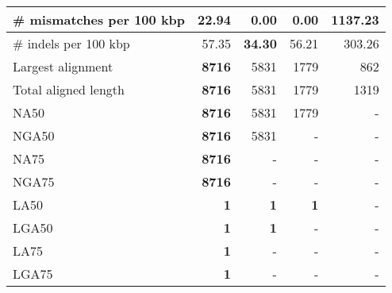 \documentclass[12pt,a4paper]{article}
\begin{document}
\begin{table}[ht]
\begin{center}
\begin{tabular}{|l*{4}{|r}|}
\# mismatches per 100 kbp & 22.94 & {\bf 0.00} & {\bf 0.00} & 1137.23 \\ \hline
\# indels per 100 kbp & 57.35 & {\bf 34.30} & 56.21 & 303.26 \\ \hline
Largest alignment & {\bf 8716} & 5831 & 1779 & 862 \\ \hline
Total aligned length & {\bf 8716} & 5831 & 1779 & 1319 \\ \hline
NA50 & {\bf 8716} & 5831 & 1779 & - \\ \hline
NGA50 & {\bf 8716} & 5831 & - & - \\ \hline
NA75 & {\bf 8716} & - & - & - \\ \hline
NGA75 & {\bf 8716} & - & - & - \\ \hline
LA50 & {\bf 1} & {\bf 1} & {\bf 1} & - \\ \hline
LGA50 & {\bf 1} & {\bf 1} & - & - \\ \hline
LA75 & {\bf 1} & - & - & - \\ \hline
LGA75 & {\bf 1} & - & - & - \\ \hline
\end{tabular}
\end{center}
\end{table}
\end{document}
